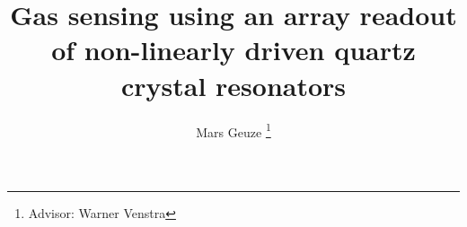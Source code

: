 \documentclass[12pt]{article}
\begin{document}
	\title{Gas sensing using an array readout of non-linearly driven quartz crystal resonators}
	\author{Mars Geuze
	\thanks{Advisor: Warner Venstra}}
	\maketitle



\tableofcontents








\end{document}
